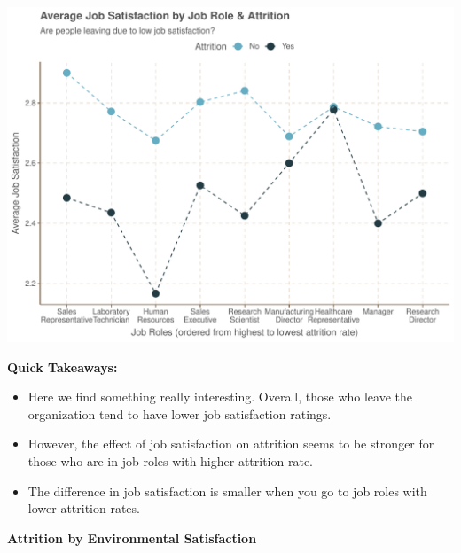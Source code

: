\documentclass[
]{article}
\providecommand{\tightlist}{%
  \setlength{\itemsep}{0pt}\setlength{\parskip}{0pt}}
\begin{document}
\includegraphics{figures/unnamed-chunk-14-1.pdf}

\textbf{Quick Takeaways:}

\begin{itemize}
\tightlist
\item
  Here we find something really interesting. Overall, those who leave
  the organization tend to have lower job satisfaction ratings.
\item
  However, the effect of job satisfaction on attrition seems to be
  stronger for those who are in job roles with higher attrition rate.
\item
  The difference in job satisfaction is smaller when you go to job roles
  with lower attrition rates.
\end{itemize}

\textbf{Attrition by Environmental Satisfaction}
\end{document}
